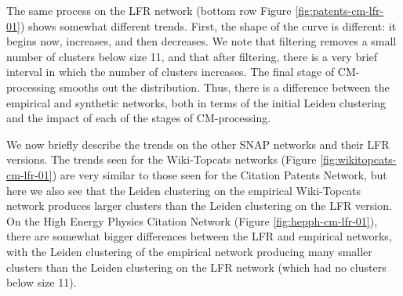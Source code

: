 \documentclass[11pt]{article}   	%
\begin{document}
The same process on the LFR network (bottom row Figure \ref{fig:patents-cm-lfr-01}) shows  somewhat different trends.
First, the shape of the curve is different: it begins now, increases, and then decreases.
We note that filtering removes a small number of clusters below size 11, and that 
after filtering, there is a very brief interval in which the number of clusters increases. 
The final stage of CM-processing smooths out the distribution.  
Thus, there is a difference between the empirical and synthetic networks, both in terms of the initial Leiden clustering and the impact of each of
the stages of CM-processing. 

We now briefly describe the trends on the other SNAP networks and their LFR versions. 
The trends seen for the Wiki-Topcats networks  (Figure \ref{fig:wikitopcats-cm-lfr-01}) are very similar to those seen for the Citation Patents
Network, but here we also see that the Leiden clustering on the empirical Wiki-Topcats network produces larger clusters than the Leiden clustering on the LFR version.
On the High Energy Physics Citation Network (Figure \ref{fig:hepph-cm-lfr-01}), there are somewhat bigger differences between the LFR and empirical networks, with the Leiden clustering of the empirical network producing many smaller clusters than the Leiden clustering on the LFR network (which had no clusters below size 11). 
\end{document}
